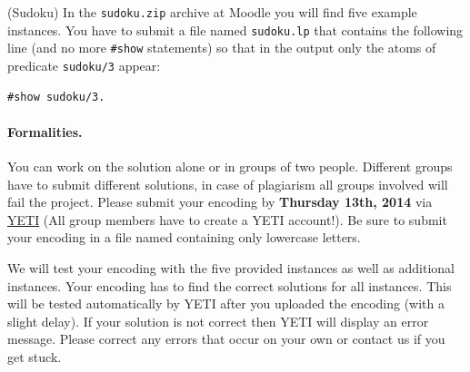 \documentclass[a4paper,12pt]{article}
\begin{document}
\begin{PraktikumsAufgabe}{1}{(Sudoku)}
\noindent
In the
{\texttt{sudoku.zip}}
archive at Moodle you will find five example instances.
You have to submit a file named \texttt{sudoku.lp} that contains the following line 
(and no more \texttt{\#show} statements)
so that in the output only the atoms of predicate \texttt{sudoku/3} appear:
\vspace{-1.5mm}
\begin{verbatim}
#show sudoku/3.
\end{verbatim}
\vspace{-1mm}

\noindent

\paragraph{Formalities.}
%
You can work on the solution alone or in groups of two people.
Different groups have to submit different solutions, 
in case of plagiarism all groups involved will fail the project.
Please submit your encoding by \textbf{Thursday 13th, 2014} via
\href{https://yeti.haiti.cs.uni-potsdam.de}{YETI}
(All group members have to create a YETI account!).
Be sure to submit your encoding in a file named 
containing only lowercase letters.

\noindent
We will test your encoding with the five provided instances as well as additional instances.
Your encoding has to find the correct solutions for all instances.
This will be tested automatically by YETI after you uploaded the encoding (with a slight delay).
If your solution is not correct then YETI will display an error message.
Please correct any errors that occur on your own or contact us if you get stuck.


\end{PraktikumsAufgabe}
\end{document}
